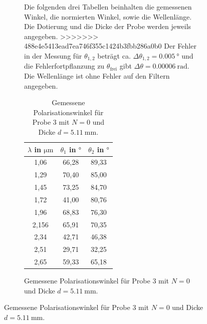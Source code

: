 \begin{figure}[H]
\begin{figure}
Die folgenden drei Tabellen beinhalten die gemessenen Winkel, die normierten Winkel, sowie die Wellenlänge. Die Dotierung und die Dicke der Probe werden jeweils angegeben.
>>>>>>> 488e4e5413ead7ea746f355c1424b3fbb286a0b0
Der Fehler in der Messung für $\theta_{1,2}$ beträgt ca. $\Delta \theta_{1,2} = \qty{0.005}{\degree}$ und die Fehlerfortpflanzung zu $\theta_\text{frei}$ gibt $\Delta \theta = \qty{0.00006}{\radian}$.
Die Wellenlänge ist ohne Fehler auf den Filtern angegeben.

\begin{table}[H]
    \centering
    \caption{Gemessene Polarisationswinkel für Probe 3 mit $N = \num{0}$ und Dicke $d = \qty{5.11}{\milli\meter}$.}
    \label{tab:probe3}
    \begin{tabular}{c c c}
        \toprule
        {$\lambda$ in $\si{\micro\meter}$} & {$\theta_1$ in $\si{\degree}$} & {$\theta_2$ in $\si{\degree}$} \\
        \midrule
        1,06  & 66,28 & 89,33 \\
        1,29  & 70,40 & 85,00 \\
        1,45  & 73,25 & 84,70 \\
        1,72  & 41,00 & 80,76 \\
        1,96  & 68,83 & 76,30 \\
        2,156 & 65,91 & 70,35 \\
        2,34  & 42,71 & 46,38 \\
        2,51  & 29,71 & 32,25 \\
        2,65  & 59,33 & 65,18 \\   
        \bottomrule
    \end{tabular}
\end{table}


\end{figure}
\end{figure}
